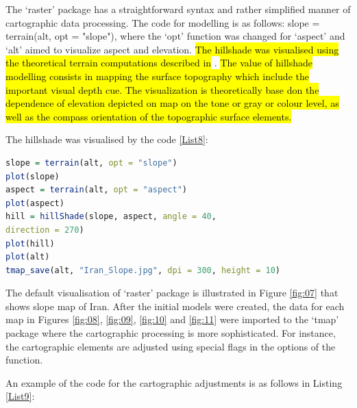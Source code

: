 \documentclass[12pt,a4paper,oneside]{article}
\def \newpar{\vspace{6pt}}
\begin{document}
\newpar The ‘raster’ package has a straightforward syntax and rather simplified manner of cartographic data processing. The code for modelling is as follows: slope = terrain(alt, opt = "slope"), where the ‘opt’ function was changed for ‘aspect’ and ‘alt’ aimed to visualize aspect and elevation. \hl{The hillshade was visualised using the theoretical terrain computations described in} \cite{1456186}. \hl{The value of hillshade modelling consists in mapping the surface topography which include the important visual depth cue. The visualization is theoretically base don the dependence of elevation depicted on map on the tone or gray or colour level, as well as the compass orientation of the topographic surface elements.}

The hillshade was visualised by the code \ref{List8}:

\begin{lstlisting}[frame=single,language=R,basicstyle=\scriptsize]
slope = terrain(alt, opt = "slope")
plot(slope)
aspect = terrain(alt, opt = "aspect")
plot(aspect)
hill = hillShade(slope, aspect, angle = 40, 
direction = 270)
plot(hill)
plot(alt)
tmap_save(alt, "Iran_Slope.jpg", dpi = 300, height = 10)
\end{lstlisting}

\newpar The default visualisation of ‘raster’ package is illustrated in Figure \ref{fig:07} that  shows slope map of Iran. After the initial models were created, the data for each map in Figures \ref{fig:08}, \ref{fig:09}, \ref{fig:10} and \ref{fig:11} were imported to the ‘tmap’ package where the cartographic processing is more sophisticated. For instance, the cartographic elements are adjusted using special flags in the options of the function. 

\newpar An example of the code for the cartographic adjustments is as follows in Listing \ref{List9}: 
\end{document}
